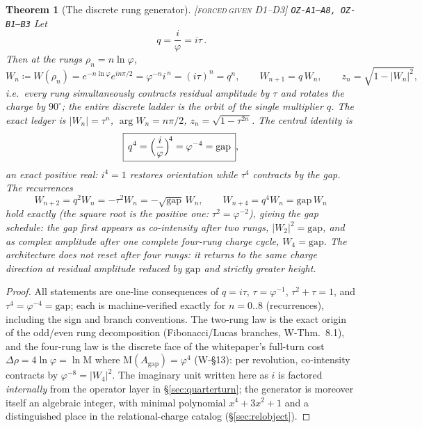 \documentclass[11pt]{article}
\newcommand{\tagFD}{\textcolor{cF}{\textsc{[forced}}\,\textcolor{cD}{\textsc{given D1--D3]}}}
\newcommand{\hx}[1]{\textcolor{cC}{\footnotesize\texttt{#1}}}
\newcommand{\gp}{\varphi}
\newcommand{\gapc}{\mathrm{gap}}
\newcommand{\M}{\mathrm{M}}
\theoremstyle{plain}
\newtheorem{theorem}{Theorem}[section]
\theoremstyle{definition}
\theoremstyle{remark}
\begin{document}
\begin{theorem}[The discrete rung generator]\label{thm:generator}\tagFD{} \hx{OZ-A1--A8, OZ-B1--B3}
Let
\[
\boxed{\,q=\frac{i}{\gp}=i\tau\,}.
\]
Then at the rungs $\rho_n=n\ln\gp$,
\[
W_n \coloneqq W(\rho_n)=e^{-n\ln\gp}e^{in\pi/2}=\gp^{-n}i^{\,n}=(i\tau)^n=q^n,
\qquad
W_{n+1}=q\,W_n,
\qquad
z_n=\sqrt{1-|W_n|^2},
\]
i.e.\ every rung simultaneously contracts residual amplitude by $\tau$ and
rotates the charge by $90^\circ$; the entire discrete ladder is the orbit of the
single multiplier $q$. The exact ledger is $|W_n|=\tau^n$,
$\arg W_n=n\pi/2$, $z_n=\sqrt{1-\tau^{2n}}$. The central identity is
\[
\boxed{\,q^4=\Bigl(\frac{i}{\gp}\Bigr)^{\!4}=\gp^{-4}=\gapc\,},
\]
an exact positive real: $i^4=1$ restores orientation while $\tau^4$ contracts by
the gap. The recurrences
\[
W_{n+2}=q^2W_n=-\tau^2W_n=-\sqrt{\gapc}\,W_n,
\qquad
W_{n+4}=q^4W_n=\gapc\,W_n
\]
hold exactly (the square root is the positive one: $\tau^2=\gp^{-2}$), giving the
\emph{gap schedule}: the gap first appears as co-intensity after two rungs,
$|W_2|^2=\gapc$, and as complex amplitude after one complete four-rung charge
cycle, $W_4=\gapc$. The architecture does not reset after four rungs: it returns
to the same charge direction at residual amplitude reduced by $\gapc$ and
strictly greater height.
\end{theorem}

\begin{proof}
All statements are one-line consequences of $q=i\tau$, $\tau=\gp^{-1}$,
$\tau^2+\tau=1$, and $\tau^4=\gp^{-4}=\gapc$; each is machine-verified exactly
for $n=0..8$ (recurrences), including the sign and branch conventions.
The two-rung law is the exact origin of the odd/even rung decomposition
(Fibonacci/Lucas branches, W-Thm.\ 8.1), and the four-rung law is the discrete
face of the whitepaper's full-turn cost $\Delta\rho=4\ln\gp=\ln\M$ where
$\M(A_{\gapc})=\gp^4$ (W-\S13): per revolution, co-intensity contracts by
$\gp^{-8}=|W_4|^2$. The imaginary unit written here as $i$ is factored
\emph{internally} from the operator layer in \S\ref{sec:quarterturn}; the
generator is moreover itself an algebraic integer, with minimal polynomial
$x^4+3x^2+1$ and a distinguished place in the relational-charge catalog
(\S\ref{sec:relobject}).
\end{proof}
\end{document}

